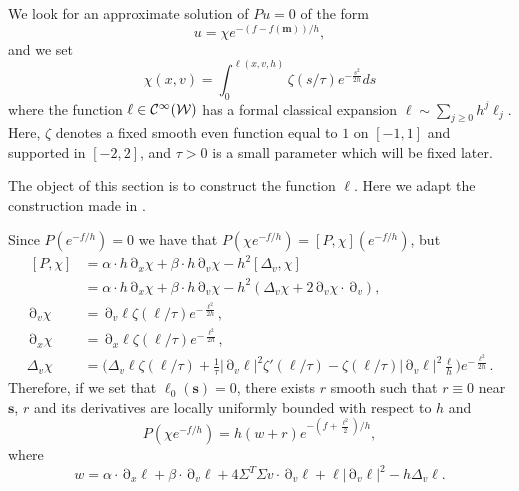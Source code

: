\documentclass[12pt]{amsart}
\numberwithin{equation}{section}
\numberwithin{figure}{section}
\def\m{\mathbf{m}}
\def\s{\mathbf{s}}
\DeclareMathOperator{\p}{\partial}
\begin{document}
We look for an approximate solution of $P u = 0$ of the form
\begin{equation*}
u=\chi e^{-(f-f(\m))/h},
\end{equation*}
and we set
\begin{equation*}
\chi(x,v)=\int_0^{\ell(x,v,h)}\zeta(s/\tau)e^{-\frac{s^2}{2h}}ds
\end{equation*}
where the function $\ell\in{\mathcal C}^\infty({\mathcal W})$ has a formal classical expansion $\ell\sim\sum_{j\geq0}h^j\ell_j$. Here, $\zeta$ denotes a fixed smooth even function equal to $1$ on $[-1,1]$ and supported in $[-2,2]$, and $\tau > 0$ is a small parameter which will be fixed later.

The object of this section is to construct the function $\ell$. Here we adapt the construction made in \cite[section 3]{BoLePMi22}.

Since $P(e^{-f/h}) = 0$ we have that $P(\chi e^{-f/h}) = [P,\chi](e^{-f/h})$, but
\begin{equation*}
\begin{aligned}~
    [P,\chi] &= \alpha\cdot h\p_x\chi + \beta\cdot h\p_v\chi - h^2[\Delta_v,\chi]\\
    &= \alpha\cdot h\p_x\chi + \beta\cdot h\p_v\chi - h^2(\Delta_v \chi + 2\p_v \chi\cdot\p_v),\\
    \p_v \chi &= \p_v\ell\zeta(\ell/\tau)e^{-\frac{\ell^{2}}{2h}},\\
    \p_x \chi &= \p_x\ell\zeta(\ell/\tau)e^{-\frac{\ell^{2}}{2h}},\\
    \Delta_v \chi &= \Big(\Delta_v\ell\zeta(\ell/\tau) + \frac1\tau|\p_v\ell|^2\zeta'(\ell/\tau)-\zeta(\ell/\tau)|\p_v\ell|^2\frac{\ell}{h}\Big)e^{-\frac{\ell^{2}}{2h}}.
\end{aligned}
\end{equation*}
Therefore, if we set that $\ell_0(\s) = 0$, there exists $r$ smooth such that $r\equiv0$ near $\s$, $r$ and its derivatives are locally uniformly bounded with respect to $h$ and
\begin{equation}\label{eq:wplusr}
P(\chi e^{-f/h}) = h(w+r)e^{-(f+\frac{\ell^{2}}{2})/h},
\end{equation}
where
\begin{equation*}
w = \alpha\cdot \p_x\ell + \beta\cdot \p_v\ell + 4\Sigma^T\Sigma v\cdot\p_v\ell + \ell|\p_v\ell|^2 - h\Delta_v\ell.
\end{equation*}
\end{document}
